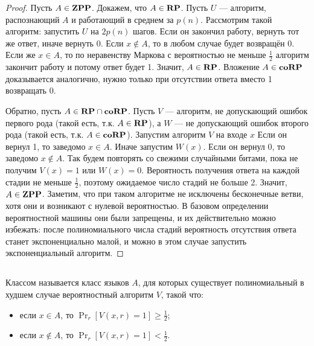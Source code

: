 \begin{proof}
Пусть $A \in \textbf{ZPP}$. Докажем, что $A \in \textbf{RP}$. Пусть $U$ --- алгоритм, распознающий $A$ и работающий в среднем за $p(n)$. Рассмотрим такой алгоритм: запустить $U$ на $2p(n)$ шагов. Если он закончил работу, вернуть тот же ответ, иначе вернуть 0. Если $x \not \in A$, то в любом случае будет возвращён 0. Если же $x \in A$, то по неравенству Маркова с вероятностью не меньше $\frac{1}{2}$ алгоритм закончит работу и потому ответ будет 1. Значит, $A \in \textbf{RP}$. Вложение $A \in \textbf{coRP}$ доказывается аналогично, нужно только при отсутствии ответа вместо 1 возвращать 0.

Обратно, пусть $A \in \textbf{RP} \cap \textbf{coRP}$. Пусть $V$ --- алгоритм, не допускающий ошибок первого рода (такой есть, т.к. $A \in \textbf{RP}$), а $W$ --- не допускающий ошибок второго рода (такой есть, т.к. $A \in \textbf{coRP}$). Запустим алгоритм $V$ на входе $x$ Если он вернул 1, то заведомо $x \in A$. Иначе запустим $W(x)$. Если он вернул 0, то заведомо $x \not \in A$. Так будем повторять со свежими случайными битами, пока не получим $V(x) = 1$ или $W(x) = 0$. Вероятность получения ответа на каждой стадии не меньше $\frac{1}{2}$, поэтому ожидаемое число стадий не больше 2. Значит, $A \in \textbf{ZPP}$. Заметим, что при таком алгоритме не исключены бесконечные ветви, хотя они и возникают с нулевой вероятностью. В базовом определении вероятностной машины они были запрещены, и их действительно можно избежать: после полиномиального числа стадий вероятность отсутствия ответа станет экспоненциально малой, и можно в этом случае запустить экспоненциальный алгоритм.

\end{proof}

\subsection{\pp}

\begin{definition}
Классом \pp называется класс языков $A$, для которых существует полиномиальный в худшем случае вероятностный алгоритм $V$, такой что:

\begin{itemize}
    \item если $x \in A$, то $\Pr_r[V(x,r) = 1] \geq \frac{1}{2}$;
    \item если $x \not\in A$, то $\Pr_r[V(x,r) = 1] < \frac{1}{2}$.
\end{itemize}
\end{definition}

